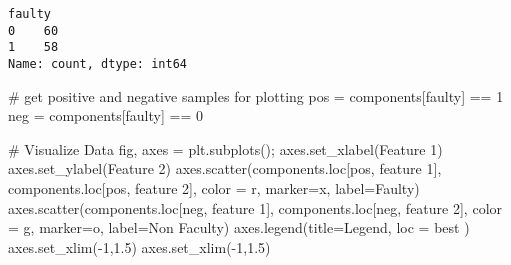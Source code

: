 \documentclass[
  letterpaper,
  DIV=11,
  numbers=noendperiod]{scrreprt}
\newenvironment{Shaded}{\begin{snugshade}}{\end{snugshade}}
\newcommand{\CommentTok}[1]{\textcolor[rgb]{0.37,0.37,0.37}{#1}}
\newcommand{\DecValTok}[1]{\textcolor[rgb]{0.68,0.00,0.00}{#1}}
\newcommand{\FloatTok}[1]{\textcolor[rgb]{0.68,0.00,0.00}{#1}}
\newcommand{\NormalTok}[1]{\textcolor[rgb]{0.00,0.23,0.31}{#1}}
\newcommand{\OperatorTok}[1]{\textcolor[rgb]{0.37,0.37,0.37}{#1}}
\newcommand{\StringTok}[1]{\textcolor[rgb]{0.13,0.47,0.30}{#1}}
\begin{document}
\begin{verbatim}
faulty
0    60
1    58
Name: count, dtype: int64
\end{verbatim}

\begin{Shaded}
\begin{Highlighting}[]
\CommentTok{\# get positive and negative samples for plotting}
\NormalTok{pos }\OperatorTok{=}\NormalTok{ components[}\StringTok{\textquotesingle{}faulty\textquotesingle{}}\NormalTok{] }\OperatorTok{==} \DecValTok{1}
\NormalTok{neg }\OperatorTok{=}\NormalTok{ components[}\StringTok{\textquotesingle{}faulty\textquotesingle{}}\NormalTok{] }\OperatorTok{==} \DecValTok{0}
\end{Highlighting}
\end{Shaded}

\begin{Shaded}
\begin{Highlighting}[]
\CommentTok{\# Visualize Data}
\NormalTok{fig, axes }\OperatorTok{=}\NormalTok{ plt.subplots()}\OperatorTok{;}
\NormalTok{axes.set\_xlabel(}\StringTok{\textquotesingle{}Feature 1\textquotesingle{}}\NormalTok{)}
\NormalTok{axes.set\_ylabel(}\StringTok{\textquotesingle{}Feature 2\textquotesingle{}}\NormalTok{)}
\NormalTok{axes.scatter(components.loc[pos, }\StringTok{\textquotesingle{}feature 1\textquotesingle{}}\NormalTok{], components.loc[pos, }\StringTok{\textquotesingle{}feature 2\textquotesingle{}}\NormalTok{], color }\OperatorTok{=} \StringTok{\textquotesingle{}r\textquotesingle{}}\NormalTok{, marker}\OperatorTok{=}\StringTok{\textquotesingle{}x\textquotesingle{}}\NormalTok{, label}\OperatorTok{=}\StringTok{\textquotesingle{}Faulty\textquotesingle{}}\NormalTok{)}
\NormalTok{axes.scatter(components.loc[neg, }\StringTok{\textquotesingle{}feature 1\textquotesingle{}}\NormalTok{], components.loc[neg, }\StringTok{\textquotesingle{}feature 2\textquotesingle{}}\NormalTok{], color }\OperatorTok{=} \StringTok{\textquotesingle{}g\textquotesingle{}}\NormalTok{, marker}\OperatorTok{=}\StringTok{\textquotesingle{}o\textquotesingle{}}\NormalTok{, label}\OperatorTok{=}\StringTok{\textquotesingle{}Non Faculty\textquotesingle{}}\NormalTok{)}
\NormalTok{axes.legend(title}\OperatorTok{=}\StringTok{\textquotesingle{}Legend\textquotesingle{}}\NormalTok{, loc }\OperatorTok{=} \StringTok{\textquotesingle{}best\textquotesingle{}}\NormalTok{ )}
\NormalTok{axes.set\_xlim(}\OperatorTok{{-}}\DecValTok{1}\NormalTok{,}\FloatTok{1.5}\NormalTok{)}
\NormalTok{axes.set\_xlim(}\OperatorTok{{-}}\DecValTok{1}\NormalTok{,}\FloatTok{1.5}\NormalTok{)}
\end{Highlighting}
\end{Shaded}
\end{document}

